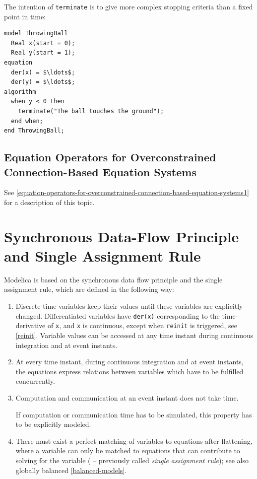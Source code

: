 \begin{example}
The intention of \lstinline!terminate! is to give more complex stopping criteria than a fixed point in time:
\begin{lstlisting}[language=modelica]
model ThrowingBall
  Real x(start = 0);
  Real y(start = 1);
equation
  der(x) = $\ldots$;
  der(y) = $\ldots$;
algorithm
  when y < 0 then
    terminate("The ball touches the ground");
  end when;
end ThrowingBall;
\end{lstlisting}
\end{example}


\subsection{Equation Operators for Overconstrained Connection-Based Equation Systems}\label{equation-operators-for-overconstrained-connection-based-equation-systems}

See \cref{equation-operators-for-overconstrained-connection-based-equation-systems1} for a description of this topic.


\section{Synchronous Data-Flow Principle and Single Assignment Rule}\label{synchronous-data-flow-principle-and-single-assignment-rule}

Modelica is based on the synchronous data flow principle and the single assignment rule, which are defined in the following way:
\begin{enumerate}
\item Discrete-time variables keep their values until these variables are explicitly changed.
Differentiated variables have \lstinline!der(x)! corresponding to the time-derivative of \lstinline!x!, and \lstinline!x! is continuous, except when \lstinline!reinit! is triggered, see \cref{reinit}.
Variable values can be accessed at any time instant during continuous integration and at event instants.

\item At every time instant, during continuous integration and at event instants, the equations express relations between variables which have to be fulfilled concurrently.

\item Computation and communication at an event instant does not take time.
\begin{nonnormative}
If computation or communication time has to be simulated, this property has to be explicitly modeled.
\end{nonnormative}

\item There must exist a perfect matching of variables to equations after flattening, where a variable can only be matched to equations that can contribute to solving for the variable
( -- previously called \emph{single assignment rule}); see also globally balanced \cref{balanced-models}.
\end{enumerate}



